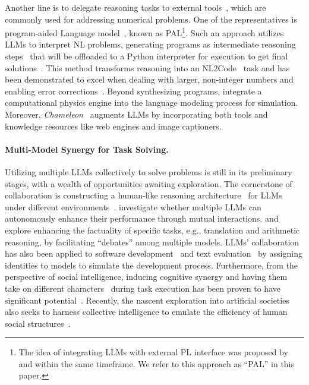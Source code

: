 Another line is to delegate reasoning tasks to external tools~\citep{qin2023toolllm}, 
which are commonly used for addressing numerical problems.
One of the representatives is program-aided Language model~\citep{gao2022pal}, 
known as PAL\footnote{The idea of integrating LLMs with external PL interface was proposed by~\citet{gao2022pal} and \citet{chen2022program} within the same timeframe. 
We refer to this approach as ``PAL'' in this paper.}.
Such an approach utilizes LLMs to interpret NL problems, 
generating programs as intermediate reasoning steps~\citep{chen2022program} that will be offloaded to a Python interpreter for execution to get final solutions~\citep{ni2023lever}.
This method transforms reasoning into an NL2Code~\citep{zan2023large} task and has been demonstrated to excel when dealing with larger, non-integer numbers and enabling error corrections~\citep{olausson2023demystify}.
Beyond synthesizing programs, 
\citet{liu2023minds} integrate a computational physics engine into the language
modeling process for simulation.
Moreover,
\textit{Chameleon}~\citep{lu2023chameleon} augments LLMs by incorporating both tools and knowledge resources like web engines and image captioners.

\paragraph{Multi-Model Synergy for Task Solving.}
Utilizing multiple LLMs collectively to solve problems is still in its preliminary stages,
with a wealth of opportunities awaiting exploration. 
The cornerstone of collaboration is constructing a human-like reasoning architecture~\citep{zhu2023solving} for LLMs under different environments~\citep{liu2023agentbench}. 
\citet{fu2023improving} investigate whether multiple LLMs can autonomously enhance their performance through mutual interactions.
\citet{du2023improving} and \citet{liang2023encouraging} explore enhancing the factuality of specific tasks, e.g., translation and arithmetic reasoning, by facilitating ``debates'' among multiple models.
LLMs' collaboration has also been applied to software development~\citep{qian2023communicative} and text evaluation~\citep{chan2023chateval}
by assigning identities to models to simulate the development process.
Furthermore, 
from the perspective of social intelligence, 
inducing cognitive synergy and having them take on different characters~\citep{wang2023unleashing} during task execution has been proven to have significant potential~\citep{sclar2023minding}.
Recently, 
the nascent exploration into artificial societies~\citep{park2023generativeagents} also seeks to harness collective intelligence to emulate the efficiency of human social structures~\citep{li2023camel, webb2023emergent}.
